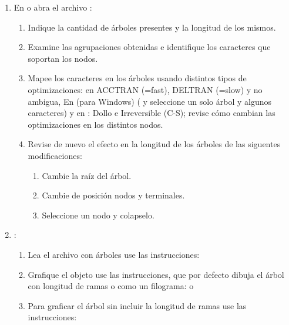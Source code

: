 \begin{enumerate}
	\item En  o  abra el archivo :
	\begin{enumerate}

		\item Indique la cantidad de \'arboles presentes y la longitud de los mismos.

		\item Examine las agrupaciones obtenidas e identifique los caracteres que soportan los nodos.

		\item Mapee los caracteres en los \'arboles usando distintos tipos de optimizaciones: en  ACCTRAN (=fast), DELTRAN (=slow) y no ambigua, En  (para Windows) ( y seleccione un solo \'arbol y algunos caracteres) y en : Dollo e Irreversible (C-S); revise c\'omo cambian las optimizaciones en los distintos nodos.

		\item Revise de nuevo el efecto en la longitud de los \'arboles de las siguentes modificaciones:
		\begin{enumerate}
			\item Cambie la ra\'iz del \'arbol.
			\item Cambie de posici\'on nodos y terminales.
			\item Seleccione un nodo y colapselo.
		\end{enumerate}
	
	\end{enumerate}

	

	\item \En {}:
	\begin{enumerate}

		\item Lea el archivo con \'arboles  use las instrucciones:

		\item Grafique el objeto  use las instrucciones, que por defecto dibuja el \'arbol con longitud de ramas o como un filograma:
		 o


		\item Para graficar el \'arbol sin incluir la longitud de ramas  use las instrucciones:



\end{enumerate}
\end{enumerate}
